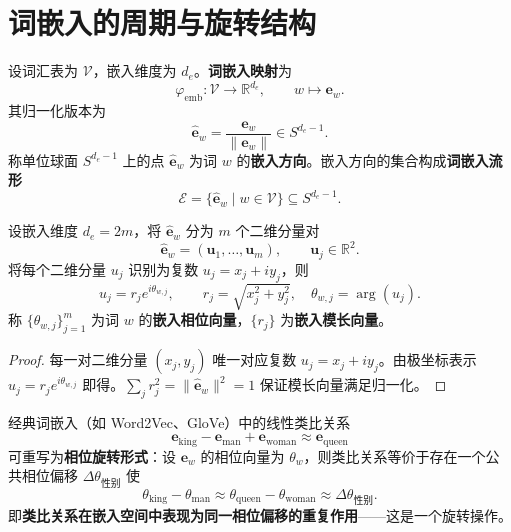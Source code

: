 \section{词嵌入的周期与旋转结构}
\label{sec:word_embedding_periodicity}

\begin{definition}[词嵌入空间]\label{def:word_embedding_space}
设词汇表为 $\mathcal{V}$，嵌入维度为 $d_e$。\textbf{词嵌入映射}为
\[
\varphi_{\text{emb}}:\mathcal{V}\to\mathbb{R}^{d_e},\qquad w\mapsto\mathbf{e}_w.
\]
其归一化版本为
\[
\widehat{\mathbf{e}}_w=\frac{\mathbf{e}_w}{\|\mathbf{e}_w\|}\in S^{d_e-1}.
\]
称单位球面 $S^{d_e-1}$ 上的点 $\widehat{\mathbf{e}}_w$ 为词 $w$ 的\textbf{嵌入方向}。嵌入方向的集合构成\textbf{词嵌入流形}
\[
\mathcal{E}=\{\widehat{\mathbf{e}}_w\mid w\in\mathcal{V}\}\subseteq S^{d_e-1}.
\]
\end{definition}

\begin{lemma}[嵌入方向的相位表示]\label{lem:embedding_phase_representation}
设嵌入维度 $d_e=2m$，将 $\widehat{\mathbf{e}}_w$ 分为 $m$ 个二维分量对
\[
\widehat{\mathbf{e}}_w=(\mathbf{u}_1,\dots,\mathbf{u}_m),\qquad \mathbf{u}_j\in\mathbb{R}^2.
\]
将每个二维分量 $u_j$ 识别为复数 $u_j=x_j+iy_j$，则
\[
u_j=r_je^{i\theta_{w,j}},\qquad
r_j=\sqrt{x_j^2+y_j^2},\quad \theta_{w,j}=\arg(u_j).
\]
称 $\{\theta_{w,j}\}_{j=1}^m$ 为词 $w$ 的\textbf{嵌入相位向量}，$\{r_j\}$ 为\textbf{嵌入模长向量}。
\end{lemma}

\begin{proof}
每一对二维分量 $(x_j,y_j)$ 唯一对应复数 $u_j=x_j+iy_j$。由极坐标表示 $u_j=r_je^{i\theta_{w,j}}$ 即得。$\sum_jr_j^2=\|\widehat{\mathbf{e}}_w\|^2=1$ 保证模长向量满足归一化。
\end{proof}

\begin{proposition}[词嵌入的旋转类比关系]\label{prop:embedding_rotation_analogy}
经典词嵌入（如 Word2Vec、GloVe）中的线性类比关系
\[
\mathbf{e}_{\text{king}}-\mathbf{e}_{\text{man}}+\mathbf{e}_{\text{woman}}\approx\mathbf{e}_{\text{queen}}
\]
可重写为\textbf{相位旋转形式}：设 $\mathbf{e}_w$ 的相位向量为 $\theta_w$，则类比关系等价于存在一个公共相位偏移 $\Delta\theta_{\text{性别}}$ 使
\[
\theta_{\text{king}}-\theta_{\text{man}}\approx\theta_{\text{queen}}-\theta_{\text{woman}}\approx\Delta\theta_{\text{性别}}.
\]
即\textbf{类比关系在嵌入空间中表现为同一相位偏移的重复作用}——这是一个旋转操作。
\end{proposition}

